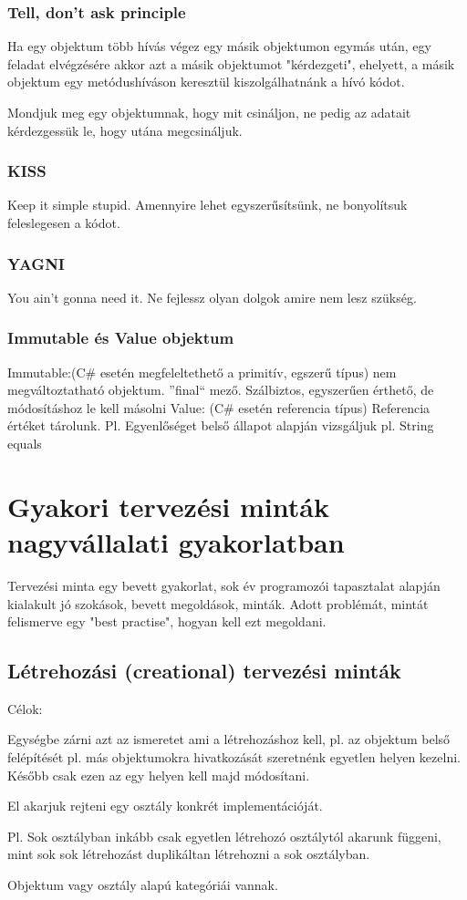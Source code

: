 \documentclass[a4paper,14pt]{extarticle}
\begin{document}
			\subsubsection{Tell, don't ask principle}
			Ha egy objektum több hívás végez egy másik objektumon egymás után, egy feladat elvégzésére akkor azt a másik objektumot "kérdezgeti", ehelyett, a másik objektum egy metódushíváson keresztül kiszolgálhatnánk a hívó kódot.
			
			Mondjuk meg egy objektumnak, hogy mit csináljon, ne pedig az adatait kérdezgessük le, hogy utána megcsináljuk.
			
			\subsubsection{KISS} Keep it simple stupid. Amennyire lehet egyszerűsítsünk, ne bonyolítsuk feleslegesen a kódot.
			
			\subsubsection{YAGNI} You ain't gonna need it.
			Ne fejlessz olyan dolgok amire nem lesz szükség.
			
			\subsubsection{Immutable és Value objektum}
			Immutable:(C\# esetén megfeleltethető a primitív, egszerű típus) nem megváltoztatható objektum. ''final`` mező. Szálbiztos, egyszerűen érthető, de módosításhoz le kell másolni
			\newline Value: (C\# esetén referencia típus)
			Referencia értéket tárolunk.
			Pl. Egyenlőséget belső állapot alapján vizsgáljuk pl. String equals
			
	\section{Gyakori tervezési minták nagyvállalati gyakorlatban}
	Tervezési minta egy bevett gyakorlat, sok év programozói tapasztalat alapján kialakult jó szokások, bevett megoldások, minták. Adott problémát, mintát felismerve egy "best practise", hogyan kell ezt megoldani.
		\subsection{Létrehozási (creational) tervezési minták}
			Célok:
			\begin{compactitem}
			\item Egységbe zárni azt az ismeretet ami a létrehozáshoz kell, pl. az objektum belső felépítését pl. más objektumokra hivatkozását szeretnénk egyetlen helyen kezelni. Később csak ezen az egy helyen kell majd módosítani.
			\item El akarjuk rejteni egy osztály konkrét implementációját.
			\end{compactitem}
			Pl. Sok osztályban inkább csak egyetlen létrehozó osztálytól akarunk függeni, mint sok sok létrehozást duplikáltan létrehozni a sok osztályban.
			\par Objektum vagy osztály alapú kategóriái vannak.
			
\end{document}
